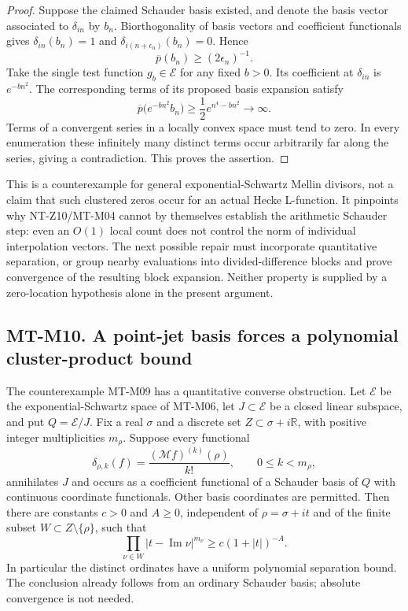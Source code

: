 \begin{proof}
Suppose the claimed Schauder basis existed, and denote the basis
vector associated to $\delta_{in}$ by $b_n$. Biorthogonality of
basis vectors and coefficient functionals gives
$\delta_{in}(b_n)=1$ and
$\delta_{i(n+\epsilon_n)}(b_n)=0$. Hence
\[
                 \overline p(b_n)\ge(2\epsilon_n)^{-1}.
\]
Take the single test function $g_b\in\mathcal E$ for any fixed
$b>0$. Its coefficient at $\delta_{in}$ is $e^{-bn^2}$.
The corresponding terms of its proposed basis expansion satisfy
\[
 \overline p\bigl(e^{-bn^2}b_n\bigr)
        \ge\frac12 e^{n^4-bn^2}\longrightarrow\infty.
\]
Terms of a convergent series in a locally convex space must tend
to zero. In every enumeration these infinitely many distinct terms
occur arbitrarily far along the series, giving a contradiction.
This proves the assertion.
\end{proof}

This is a counterexample for general exponential-Schwartz Mellin
divisors, not a claim that such clustered zeros occur for an actual
Hecke L-function. It pinpoints why NT-Z10/MT-M04 cannot by themselves
establish the arithmetic Schauder step: even an $O(1)$ local count
does not control the norm of individual interpolation vectors.
The next possible repair must incorporate quantitative separation,
or group nearby evaluations into divided-difference blocks and prove
convergence of the resulting block expansion. Neither property is
supplied by a zero-location hypothesis alone in the present argument.

\subsection*{MT-M10. A point-jet basis forces a polynomial cluster-product bound}
The counterexample MT-M09 has a quantitative converse obstruction.
Let $\mathcal E$ be the exponential-Schwartz space of MT-M06,
let $J\subset\mathcal E$ be a closed linear subspace, and put
$Q=\mathcal E/J$. Fix a real $\sigma$ and a discrete set
$Z\subset\sigma+i\mathbb R$, with positive integer multiplicities
$m_\rho$. Suppose every functional
\[
 \delta_{\rho,k}(f)=\frac{(\mathcal Mf)^{(k)}(\rho)}{k!},
 \qquad 0\le k<m_\rho,
\]
annihilates $J$ and occurs as a coefficient functional of a
Schauder basis of $Q$ with continuous coordinate functionals.
Other basis coordinates are permitted.
Then there are constants $c>0$ and $A\ge0$, independent of
$\rho=\sigma+it$ and of the finite subset
$W\subset Z\setminus\{\rho\}$, such that
\[
       \prod_{\nu\in W}|t-\operatorname{Im}\nu|^{m_\nu}
                    \ge c(1+|t|)^{-A}.                \tag{MT-M10}
\]
In particular the distinct ordinates have a uniform polynomial
separation bound. The conclusion already follows from an ordinary
Schauder basis; absolute convergence is not needed.

